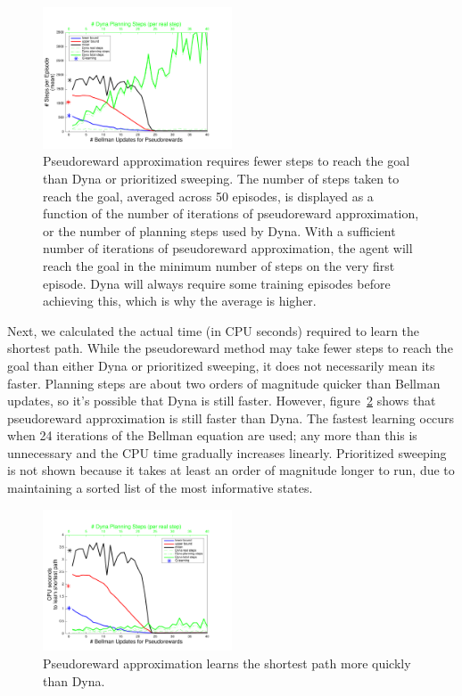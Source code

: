 \documentclass[letterpaper]{article}
\begin{document}
\begin{figure}[ht]
\centering
\includegraphics[width=0.5\textwidth]{learning_vs_PRiterations_DYNA_mean}
\caption{Pseudoreward approximation requires fewer steps to reach the goal than Dyna or prioritized sweeping. The number of steps taken to reach the goal, averaged across 50 episodes, is displayed as a function of the number of iterations of pseudoreward approximation, or the number of planning steps used by Dyna. With a sufficient number of iterations of pseudoreward approximation, the agent will reach the goal in the minimum number of steps on the very first episode. Dyna will always require some training episodes before achieving this, which is why the average is higher.}
\label{fig:maze1}
\end{figure}

Next, we calculated the actual time (in CPU seconds) required to learn the shortest path. While the pseudoreward method may take fewer steps to reach the goal than either Dyna or prioritized sweeping, it does not necessarily mean its faster. Planning steps are about two orders of magnitude quicker than Bellman updates, so it's possible that Dyna is still faster. However, figure~\ref{fig:maze2} shows that pseudoreward approximation is still faster than Dyna. The fastest learning occurs when 24 iterations of the Bellman equation are used; any more than this is unnecessary and the CPU time gradually increases linearly. Prioritized sweeping is not shown because it takes at least an order of magnitude longer to run, due to maintaining a sorted list of the most informative states.

\begin{figure}[ht]
\centering
\includegraphics[width=0.5\textwidth]{cpus_vs_PRiterations_DYNA_toGoal}
\caption{Pseudoreward approximation learns the shortest path more quickly than Dyna.}
\label{fig:maze2}
\end{figure}
\end{document}
